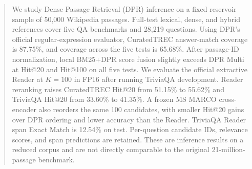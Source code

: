 \begin{abstract}
We study Dense Passage Retrieval (DPR) inference on a fixed reservoir sample of 50,000 Wikipedia passages. Full-test lexical, dense, and hybrid references cover five QA benchmarks and 28,219 questions. Using DPR's official regular-expression evaluator, CuratedTREC answer-match coverage is 87.75\%, and coverage across the five tests is 65.68\%. After passage-ID normalization, local BM25+DPR score fusion slightly exceeds DPR Multi at Hit@20 and Hit@100 on all five tests. We evaluate the official extractive Reader at $K=100$ in FP16 after running TriviaQA development. Reader reranking raises CuratedTREC Hit@20 from 51.15\% to 55.62\% and TriviaQA Hit@20 from 33.60\% to 41.35\%. A frozen MS MARCO cross-encoder also reorders the same 100 candidates, with smaller Hit@20 gains over DPR ordering and lower accuracy than the Reader. TriviaQA Reader span Exact Match is 12.54\% on test. Per-question candidate IDs, relevance scores, and span predictions are retained. These are inference results on a reduced corpus and are not directly comparable to the original 21-million-passage benchmark.
\end{abstract}
